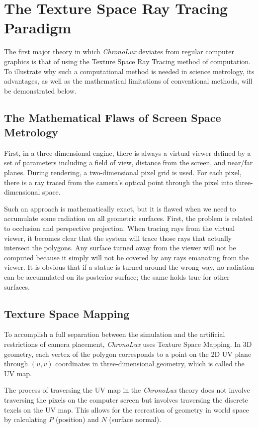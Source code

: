 \section{The Texture Space Ray Tracing Paradigm}\label{sec:texture_space_paradigm}
The first major theory in which \textit{ChronoLux} deviates from regular computer graphics is that of using the Texture Space Ray Tracing method of computation. To illustrate why such a computational method is needed in science metrology, its advantages, as well as the mathematical limitations of conventional methods, will be demonstrated below.

\subsection{The Mathematical Flaws of Screen Space Metrology}
First, in a three-dimensional engine, there is always a virtual viewer defined by a set of parameters including a field of view, distance from the screen, and near/far planes. During rendering, a two-dimensional pixel grid is used. For each pixel, there is a ray traced from the camera's optical point through the pixel into three-dimensional space.

Such an approach is mathematically exact, but it is flawed when we need to accumulate some radiation on all geometric surfaces. First, the problem is related to occlusion and perspective projection. When tracing rays from the virtual viewer, it becomes clear that the system will trace those rays that actually intersect the polygons. Any surface turned away from the viewer will not be computed because it simply will not be covered by any rays emanating from the viewer. It is obvious that if a statue is turned around the wrong way, no radiation can be accumulated on its posterior surface; the same holds true for other surfaces.

\subsection{Texture Space Mapping}
To accomplish a full separation between the simulation and the artificial restrictions of camera placement, \textit{ChronoLux} uses Texture Space Mapping. In 3D geometry, each vertex of the polygon corresponds to a point on the 2D UV plane through $(u, v)$ coordinates in three-dimensional geometry, which is called the UV map.

The process of traversing the UV map in the \textit{ChronoLux} theory does not involve traversing the pixels on the computer screen but involves traversing the discrete texels on the UV map. This allows for the recreation of geometry in world space by calculating $P$ (position) and $N$ (surface normal).

